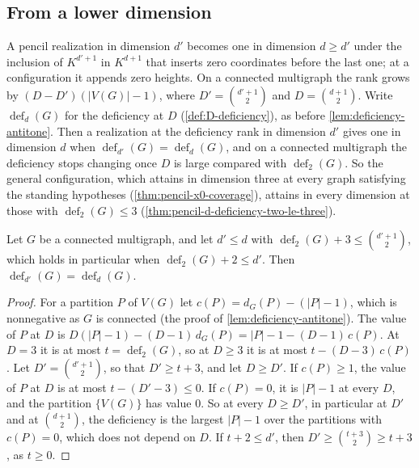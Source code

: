 \subsection{From a lower dimension}
\label{sec:pencil-d-stable}

A pencil realization in dimension $d'$ becomes one in dimension
$d \ge d'$ under the inclusion of $K^{d'+1}$ in $K^{d+1}$ that inserts
zero coordinates before the last one; at a configuration it appends zero
heights. On a connected multigraph the rank grows by
$(D - D')(|V(G)| - 1)$, where $D' = \binom{d'+1}{2}$ and
$D = \binom{d+1}{2}$. Write $\operatorname{def}_d(G)$ for the deficiency
at $D$ (\cref{def:D-deficiency}), as before
\cref{lem:deficiency-antitone}. Then a realization at the deficiency
rank in dimension $d'$ gives one in dimension $d$ when
$\operatorname{def}_{d'}(G) = \operatorname{def}_d(G)$, and on a
connected multigraph the deficiency stops changing once $D$ is large
compared with $\operatorname{def}_2(G)$. So the general configuration,
which attains in dimension three at every graph satisfying the standing
hypotheses (\cref{thm:pencil-x0-coverage}), attains in every dimension
at those with $\operatorname{def}_2(G) \le 3$
(\cref{thm:pencil-d-deficiency-two-le-three}).

\begin{lemma}
  \label{lem:deficiency-stable}
  \leanok
  Let $G$ be a connected multigraph, and let $d' \le d$ with
  $\operatorname{def}_2(G) + 3 \le \binom{d'+1}{2}$, which holds in
  particular when $\operatorname{def}_2(G) + 2 \le d'$. Then
  $\operatorname{def}_{d'}(G) = \operatorname{def}_d(G)$.
\end{lemma}
\begin{proof}
  \leanok
  For a partition $P$ of $V(G)$ let $c(P) = d_G(P) - (|P| - 1)$, which
  is nonnegative as $G$ is connected (the proof of
  \cref{lem:deficiency-antitone}). The value of $P$ at $D$ is
  $D(|P| - 1) - (D - 1)\,d_G(P) = |P| - 1 - (D - 1)\,c(P)$. At $D = 3$
  it is at most $t = \operatorname{def}_2(G)$, so at $D \ge 3$ it is at
  most $t - (D - 3)\,c(P)$. Let $D' = \binom{d'+1}{2}$, so that
  $D' \ge t + 3$, and let $D \ge D'$. If $c(P) \ge 1$, the value of $P$
  at $D$ is at most $t - (D' - 3) \le 0$. If $c(P) = 0$, it is
  $|P| - 1$ at every $D$, and the partition $\{V(G)\}$ has value $0$.
  So at every $D \ge D'$, in particular at $D'$ and at
  $\binom{d+1}{2}$, the deficiency is the largest $|P| - 1$ over the
  partitions with $c(P) = 0$, which does not depend on $D$. If
  $t + 2 \le d'$, then $D' \ge \binom{t+3}{2} \ge t + 3$, as $t \ge 0$.
\end{proof}

